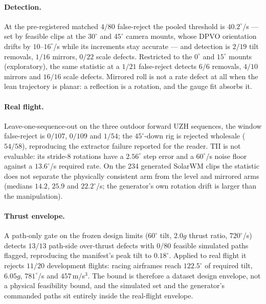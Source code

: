 \paragraph{Detection.} At the pre-registered matched $4/80$ false-reject the pooled threshold is
$40.2^\circ$/s --- set by feasible clips at the $30^\circ$ and $45^\circ$ camera mounts, whose DPVO
orientation drifts by $10$--$16^\circ$/s while its increments stay accurate --- and detection is
$2/19$ tilt removals, $1/16$ mirrors, $0/22$ scale defects. Restricted to the $0^\circ$ and
$15^\circ$ mounts (exploratory), the same statistic at a $1/21$ false-reject detects $6/6$
removals, $4/10$ mirrors and $16/16$ scale defects. Mirrored roll is not a rate defect at all
when the lean trajectory is planar: a reflection is a rotation, and the gauge fit absorbs it.

\paragraph{Real flight.} Leave-one-sequence-out on the three outdoor forward UZH sequences, the
window false-reject is $0/107$, $0/109$ and $1/54$; the $45^\circ$-down rig is rejected wholesale
($54/58$), reproducing the extractor failure reported for the reader. TII is not evaluable: its
stride-8 rotations have a $2.56^\circ$ step error and a $60^\circ$/s noise floor against a
$13.6^\circ$/s required rate. On the 234 generated SolarWM clips the statistic does not separate
the physically consistent arm from the level and mirrored arms (medians $14.2$, $25.9$ and
$22.2^\circ$/s; the generator's own rotation drift is larger than the manipulation).

\paragraph{Thrust envelope.} A path-only gate on the frozen design limits ($60^\circ$ tilt,
$2.0g$ thrust ratio, $720^\circ$/s) detects $13/13$ path-side over-thrust defects with $0/80$
feasible simulated paths flagged, reproducing the manifest's peak tilt to $0.18^\circ$. Applied to
real flight it rejects $11/20$ development flights: racing airframes reach $122.5^\circ$ of
required tilt, $6.05g$, $781^\circ$/s and $457$\,m/s$^3$. The bound is therefore a dataset design
envelope, not a physical feasibility bound, and the simulated set and the generator's commanded
paths sit entirely inside the real-flight envelope.
